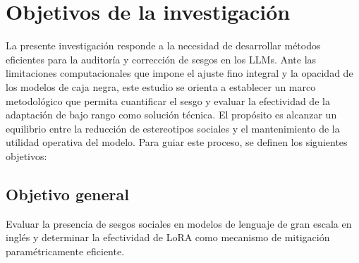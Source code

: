 \documentclass[12pt,a4paper]{report}
\begin{document}
\section{Objetivos de la investigación}
\label{sec:objetivos_investigacion}

La presente investigación responde a la necesidad de desarrollar métodos eficientes para la auditoría y corrección de sesgos en los LLMs. Ante las limitaciones computacionales que impone el ajuste fino integral y la opacidad de los modelos de caja negra, este estudio se orienta a establecer un marco metodológico que permita cuantificar el sesgo y evaluar la efectividad de la adaptación de bajo rango como solución técnica. El propósito es alcanzar un equilibrio entre la reducción de estereotipos sociales y el mantenimiento de la utilidad operativa del modelo. Para guiar este proceso, se definen los siguientes objetivos:

\subsection{Objetivo general}
\label{subsec:objetivo_general}
Evaluar la presencia de sesgos sociales en modelos de lenguaje de gran escala en inglés y determinar la efectividad de LoRA como mecanismo de mitigación paramétricamente eficiente.
\end{document}
